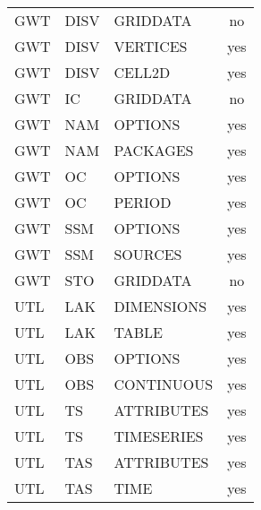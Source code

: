 \begin{longtable}{p{1.5cm} p{1.5cm} p{3cm} c}
GWT & DISV & GRIDDATA & no \\ 
GWT & DISV & VERTICES & yes \\ 
GWT & DISV & CELL2D & yes \\ 
\hline
GWT & IC & GRIDDATA & no \\ 
\hline
GWT & NAM & OPTIONS & yes \\ 
GWT & NAM & PACKAGES & yes \\ 
\hline
GWT & OC & OPTIONS & yes \\ 
GWT & OC & PERIOD & yes \\ 
\hline
GWT & SSM & OPTIONS & yes \\ 
GWT & SSM & SOURCES & yes \\ 
\hline
GWT & STO & GRIDDATA & no \\ 
\hline
UTL & LAK & DIMENSIONS & yes \\ 
UTL & LAK & TABLE & yes \\ 
\hline
UTL & OBS & OPTIONS & yes \\ 
UTL & OBS & CONTINUOUS & yes \\ 
\hline
UTL & TS & ATTRIBUTES & yes \\ 
UTL & TS & TIMESERIES & yes \\ 
\hline
UTL & TAS & ATTRIBUTES & yes \\ 
UTL & TAS & TIME & yes \\ 


\hline
\end{longtable}
\label{table:blocks}
\normalsize
